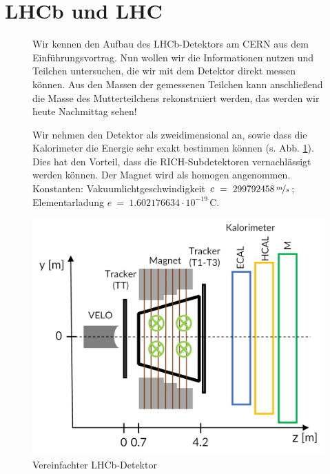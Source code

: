 

\section*{LHCb und LHC}
\begin{figure}[h]
     \begin{minipage}[t]{0.6\textwidth}
      \vspace{-6cm} Wir kennen den Aufbau des LHCb-Detektors am CERN aus dem Einführungsvortrag. Nun wollen wir die Informationen nutzen und Teilchen untersuchen, die wir mit dem Detektor direkt messen können. Aus den Massen der gemessenen Teilchen kann anschließend die Masse des Mutterteilchens rekonstruiert werden, das werden wir heute Nachmittag sehen! 
      
      Wir nehmen den Detektor als zweidimensional an, sowie dass die Kalorimeter die Energie sehr exakt bestimmen können (s. Abb. \ref{fig: Der Detektor}). Dies hat den Vorteil, dass die RICH-Subdetektoren vernachlässigt werden können. Der Magnet wird als homogen angenommen. Konstanten: Vakuumlichtgeschwindigkeit $c~=~ 299792458 \, \nicefrac{m}{s}$; Elementarladung $e~=~ 1.602176634\cdot10^{-19}$\,C.  \end{minipage}
            \begin{minipage}[t]{0.4\textwidth}
            \centering
            \includegraphics[width=\textwidth]{Figures Worksheets/LHCb_Calculation_LHCb_Detector_DE.png} 
            \caption{Vereinfachter LHCb-Detektor} \label{fig: Der Detektor}
            \end{minipage}
            \end{figure}

